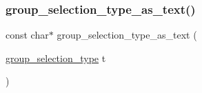 \subsubsection{\texorpdfstring{group\+\_\+selection\+\_\+type\+\_\+as\+\_\+text()}{group\_selection\_type\_as\_text()}}
{\footnotesize\ttfamily const char$\ast$ group\+\_\+selection\+\_\+type\+\_\+as\+\_\+text (\begin{DoxyParamCaption}\item[{\mbox{\hyperlink{discreta_8h_a9fbd019a849defc14910ae0a667c516e}{group\+\_\+selection\+\_\+type}}}]{t }\end{DoxyParamCaption})}

